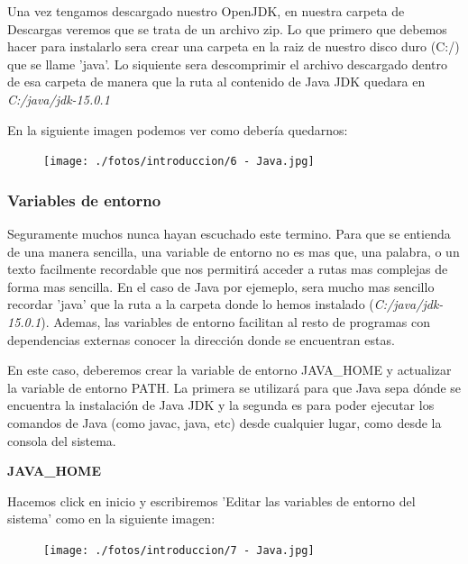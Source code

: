 \documentclass[a4paper,10pt]{article}
\begin{document}
Una vez tengamos descargado nuestro OpenJDK, en nuestra carpeta de Descargas veremos que se trata de un archivo zip. Lo que primero que debemos hacer para instalarlo sera crear una carpeta en la raiz de nuestro disco duro (C:/) que se llame 'java'. Lo siquiente sera descomprimir el archivo descargado dentro de esa carpeta de manera que la ruta al contenido de Java JDK quedara en \textit{C:/java/jdk-15.0.1}

En la siguiente imagen podemos ver como debería quedarnos:

\begin{figure}[H]
\begin{center}
\texttt{[image: ./fotos/introduccion/6 - Java.jpg]}
\end{center}
\end{figure}

\clearpage

\subsubsection{Variables de entorno}

Seguramente muchos nunca hayan escuchado este termino. Para que se entienda de una manera sencilla, una variable de entorno no es mas que, una palabra, o un texto facilmente recordable que nos permitirá acceder a rutas mas complejas de forma mas sencilla. En el caso de Java por ejemeplo, sera mucho mas sencillo recordar 'java' que la ruta a la carpeta donde lo hemos instalado (\textit{C:/java/jdk-15.0.1}). Ademas, las variables de entorno facilitan al resto de programas con dependencias externas conocer la dirección donde se encuentran estas.

En este caso, deberemos crear la variable de entorno JAVA\_HOME y actualizar la variable de entorno PATH. La primera se utilizará para que Java sepa dónde se encuentra la instalación de Java JDK y la segunda es para poder ejecutar los comandos de Java (como javac, java, etc) desde cualquier lugar, como desde la consola del sistema. 

\textbf{JAVA\_HOME}

Hacemos click en inicio y escribiremos 'Editar las variables de entorno del sistema' como en la siguiente imagen:

\begin{figure}[H]
\begin{center}
\texttt{[image: ./fotos/introduccion/7 - Java.jpg]}
\end{center}
\end{figure}
\end{document}
